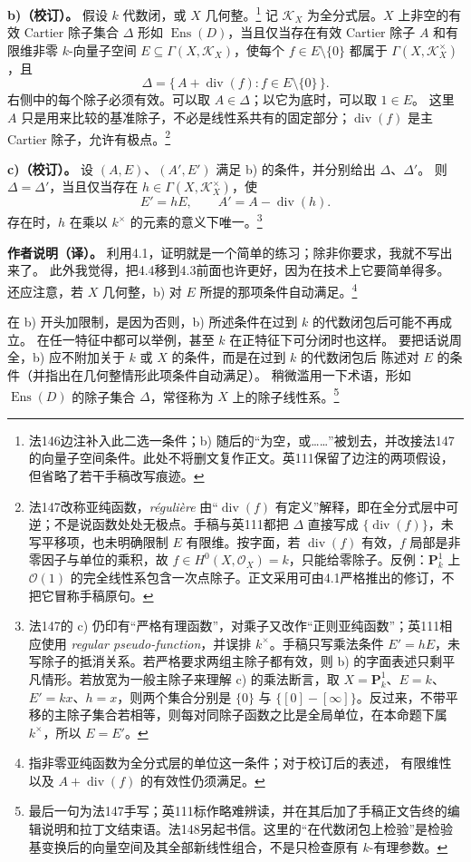 \documentclass[openany,fontset=fandol]{ctexbook}
\DeclareMathOperator{\Div}{div}
\DeclareMathOperator{\Ens}{Ens}
\newcommand{\OO}{\mathcal O}
\newcommand{\KK}{\mathcal K}
\newcommand{\PP}{\mathbf P}
\begin{document}
\smallskip\noindent\textbf{b)（校订）。}
假设 \(k\) 代数闭，或 \(X\) 几何整。\footnote{法146边注补入此二选一条件；b) 随后的“为空，或……”被划去，并改接法147的向量子空间条件。此处不将删文复作正文。英111保留了边注的两项假设，但省略了若干手稿改写痕迹。}
记 \(\KK_X\) 为全分式层。\(X\) 上非空的有效 Cartier 除子集合 \(\Delta\) 形如
\(\Ens(D)\)，当且仅当存在有效 Cartier 除子 \(A\) 和有限维非零
\(k\)-向量子空间 \(E\subseteq\Gamma(X,\KK_X)\)，使每个 \(f\in E\setminus\{0\}\)
都属于 \(\Gamma(X,\KK_X^\times)\)，且
\[
 \Delta=\{\, A+\Div(f): f\in E\setminus\{0\}\,\}.
\]
右侧中的每个除子必须有效。可以取 \(A\in\Delta\)；以它为底时，可以取 \(1\in E\)。
这里 \(A\) 只是用来比较的基准除子，不必是线性系共有的固定部分；\(\Div(f)\) 是主 Cartier 除子，允许有极点。\footnote{法147改称亚纯函数，\emph{régulière} 由“\(\Div(f)\) 有定义”解释，即在全分式层中可逆；不是说函数处处无极点。手稿与英111都把 \(\Delta\) 直接写成 \(\{\Div(f)\}\)，未写平移项，也未明确限制 \(E\) 有限维。按字面，若 \(\Div(f)\) 有效，\(f\) 局部是非零因子与单位的乘积，故 \(f\in H^0(X,\OO_X)=k\)，只能给零除子。反例：\(\PP^1_k\) 上 \(\OO(1)\) 的完全线性系包含一次点除子。正文采用可由4.1严格推出的修订，不把它冒称手稿原句。}

\smallskip\noindent\textbf{c)（校订）。}
设 \((A,E)\)、\((A',E')\) 满足 b) 的条件，并分别给出 \(\Delta\)、\(\Delta'\)。
则 \(\Delta=\Delta'\)，当且仅当存在 \(h\in\Gamma(X,\KK_X^\times)\)，使
\[
 E'=hE,\qquad A'=A-\Div(h).
\]
存在时，\(h\) 在乘以 \(k^\times\) 的元素的意义下唯一。\footnote{法147的 c) 仍印有“严格有理函数”，对乘子又改作“正则亚纯函数”；英111相应使用 \emph{regular pseudo-function}，并误排 \(k^\times\)。手稿只写乘法条件 \(E'=hE\)，未写除子的抵消关系。若严格要求两组主除子都有效，则 b) 的字面表述只剩平凡情形。若放宽为一般主除子来理解 c) 的乘法断言，取 \(X=\PP^1_k\)、\(E=k\)、\(E'=kx\)、\(h=x\)，则两个集合分别是 \(\{0\}\) 与 \(\{[0]-[\infty]\}\)。反过来，不带平移的主除子集合若相等，则每对同除子函数之比是全局单位，在本命题下属 \(k^\times\)，所以 \(E=E'\)。}

\medskip\noindent\textbf{作者说明（译）。}
利用4.1，证明就是一个简单的练习；除非你要求，我就不写出来了。
此外我觉得，把4.4移到4.3前面也许更好，因为在技术上它要简单得多。
还应注意，若 \(X\) 几何整，b) 对 \(E\) 所提的那项条件自动满足。\footnote{指非零亚纯函数为全分式层的单位这一条件；对于校订后的表述，
有限维性以及 \(A+\Div(f)\) 的有效性仍须满足。}

在 b) 开头加限制，是因为否则，b) 所述条件在过到 \(k\) 的代数闭包后可能不再成立。
在任一特征中都可以举例，甚至 \(k\) 在正特征下可分闭时也这样。
要把话说周全，b) 应不附加关于 \(k\) 或 \(X\) 的条件，而是在过到 \(k\) 的代数闭包后
陈述对 \(E\) 的条件（并指出在几何整情形此项条件自动满足）。
稍微滥用一下术语，形如 \(\Ens(D)\) 的除子集合 \(\Delta\)，常径称为 \(X\) 上的除子线性系。\footnote{最后一句为法147手写；英111标作略难辨读，并在其后加了手稿正文告终的编辑说明和拉丁文结束语。法148另起书信。这里的“在代数闭包上检验”是检验基变换后的向量空间及其全部新线性组合，不是只检查原有 \(k\)-有理参数。}
\end{document}
